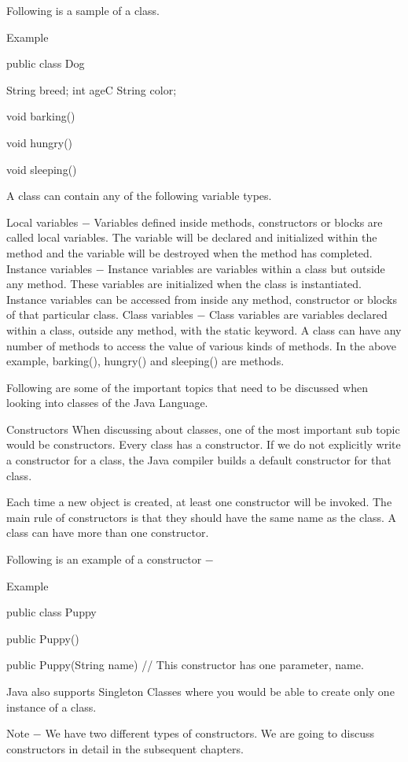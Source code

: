 Following is a sample of a class.

Example

public class Dog {
   String breed;
   int ageC
   String color;

   void barking() {
   }

   void hungry() {
   }

   void sleeping() {
   }
}
A class can contain any of the following variable types.

Local variables − Variables defined inside methods, constructors or blocks are called local variables. The variable will be declared and initialized within the method and the variable will be destroyed when the method has completed.
Instance variables − Instance variables are variables within a class but outside any method. These variables are initialized when the class is instantiated. Instance variables can be accessed from inside any method, constructor or blocks of that particular class.
Class variables − Class variables are variables declared within a class, outside any method, with the static keyword.
A class can have any number of methods to access the value of various kinds of methods. In the above example, barking(), hungry() and sleeping() are methods.

Following are some of the important topics that need to be discussed when looking into classes of the Java Language.

Constructors
When discussing about classes, one of the most important sub topic would be constructors. Every class has a constructor. If we do not explicitly write a constructor for a class, the Java compiler builds a default constructor for that class.

Each time a new object is created, at least one constructor will be invoked. The main rule of constructors is that they should have the same name as the class. A class can have more than one constructor.

Following is an example of a constructor −

Example

public class Puppy {
   public Puppy() {
   }

   public Puppy(String name) {
      // This constructor has one parameter, name.
   }
}
Java also supports Singleton Classes where you would be able to create only one instance of a class.

Note − We have two different types of constructors. We are going to discuss constructors in detail in the subsequent chapters.

